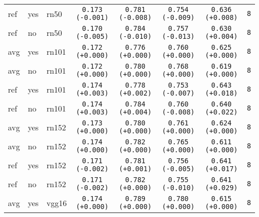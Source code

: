 \begin{tabular}{|l|l|l|c|c|c|c|c|}
\hline
ref & yes & rn50 & \texttt{0.173 {\color{red}(-0.001)}} & \texttt{0.781 {\color{green}(-0.008)}} & \texttt{0.754 {\color{green}(-0.009)}} & \texttt{0.636 {\color{green}(+0.008)}} & \texttt{8} \\
ref & no & rn50 & \texttt{0.170 {\color{red}(-0.005)}} & \texttt{0.784 {\color{green}(-0.010)}} & \texttt{0.757 {\color{green}(-0.013)}} & \texttt{0.630 {\color{green}(+0.004)}} & \texttt{8} \\
\hline
\rowcolor{verylightgray}avg & yes & rn101 & \texttt{0.172 {\color{black}(+0.000)}} & \texttt{0.776 {\color{black}(+0.000)}} & \texttt{0.760 {\color{black}(+0.000)}} & \texttt{0.625 {\color{black}(+0.000)}} & \texttt{8} \\
\rowcolor{verylightgray}avg & no & rn101 & \texttt{0.172 {\color{black}(+0.000)}} & \texttt{0.780 {\color{black}(+0.000)}} & \texttt{0.768 {\color{black}(+0.000)}} & \texttt{0.619 {\color{black}(+0.000)}} & \texttt{8} \\
\hline
ref & yes & rn101 & \texttt{0.174 {\color{green}(+0.003)}} & \texttt{0.778 {\color{red}(+0.002)}} & \texttt{0.753 {\color{green}(-0.007)}} & \texttt{0.643 {\color{green}(+0.018)}} & \texttt{8} \\
ref & no & rn101 & \texttt{0.174 {\color{green}(+0.003)}} & \texttt{0.784 {\color{red}(+0.004)}} & \texttt{0.760 {\color{green}(-0.008)}} & \texttt{0.640 {\color{green}(+0.022)}} & \texttt{8} \\
\hline
\rowcolor{verylightgray}avg & yes & rn152 & \texttt{0.173 {\color{black}(+0.000)}} & \texttt{0.780 {\color{black}(+0.000)}} & \texttt{0.761 {\color{black}(+0.000)}} & \texttt{0.624 {\color{black}(+0.000)}} & \texttt{8} \\
\rowcolor{verylightgray}avg & no & rn152 & \texttt{0.174 {\color{black}(+0.000)}} & \texttt{0.782 {\color{black}(+0.000)}} & \texttt{0.765 {\color{black}(+0.000)}} & \texttt{0.611 {\color{black}(+0.000)}} & \texttt{8} \\
\hline
ref & yes & rn152 & \texttt{0.171 {\color{red}(-0.002)}} & \texttt{0.781 {\color{red}(+0.001)}} & \texttt{0.756 {\color{green}(-0.005)}} & \texttt{0.641 {\color{green}(+0.017)}} & \texttt{8} \\
ref & no & rn152 & \texttt{0.171 {\color{red}(-0.002)}} & \texttt{0.782 {\color{black}(+0.000)}} & \texttt{0.755 {\color{green}(-0.010)}} & \texttt{0.641 {\color{green}(+0.029)}} & \texttt{8} \\
\hline
\rowcolor{verylightgray}avg & yes & vgg16 & \texttt{0.174 {\color{black}(+0.000)}} & \texttt{0.789 {\color{black}(+0.000)}} & \texttt{0.780 {\color{black}(+0.000)}} & \texttt{0.615 {\color{black}(+0.000)}} & \texttt{8} \\

\end{tabular}
